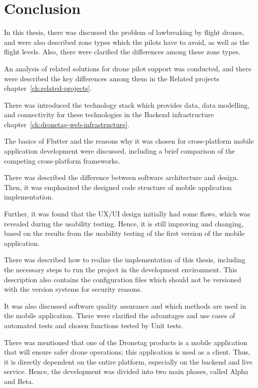 \chapter{Conclusion}\label{ch:conclusion}
In this thesis, there was discussed the problem of lawbreaking by flight drones, and were also described zone types which the pilots have to avoid, as well as the flight levels.
Also, there were clarified the differences among these zone types.

An analysis of related solutions for drone pilot support was conducted, and there were described the key differences among them in the Related projects chapter~\ref{ch:related-projects}.

There was introduced the technology stack which provides data, data modelling, and connectivity for these technologies in the Backend infrastructure chapter~\ref{ch:dronetag-web-infrastructure}.

The basics of Flutter and the reasons why it was chosen for cross-platform mobile application development were discussed, including a brief comparison of the competing cross-platform frameworks.

There was described the difference between software architecture and design.
Then, it was emphasized the designed code structure of mobile application implementation.

Further, it was found that the UX/UI design initially had some flaws, which was revealed during the usability testing.
Hence, it is still improving and changing, based on the results from the usability testing of the first version of the mobile application.

There was described how to realize the implementation of this thesis, including the necessary steps to run the project in the development environment.
This description also contains the configuration files which should not be versioned with the version systems for security reasons.

It was also discussed software quality assurance and which methods are used in the mobile application.
There were clarified the advantages and use cases of automated tests and chosen functions tested by Unit tests.

There was mentioned that one of the Dronetag products is a mobile application that will ensure safer drone operations;
this application is used as a client.
Thus, it is directly dependent on the entire platform, especially on the backend and live service.
Hence, the development was divided into two main phases, called Alpha and Beta.

